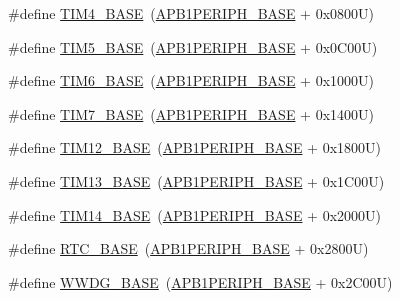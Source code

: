 \begin{DoxyCompactItemize}
\#define \hyperlink{group___peripheral__memory__map_ga56e2d44b0002f316527b8913866a370d}{T\+I\+M4\+\_\+\+B\+A\+SE}~(\hyperlink{group___peripheral__memory__map_ga45666d911f39addd4c8c0a0ac3388cfb}{A\+P\+B1\+P\+E\+R\+I\+P\+H\+\_\+\+B\+A\+SE} + 0x0800\+U)
\item 
\#define \hyperlink{group___peripheral__memory__map_ga3e1671477190d065ba7c944558336d7e}{T\+I\+M5\+\_\+\+B\+A\+SE}~(\hyperlink{group___peripheral__memory__map_ga45666d911f39addd4c8c0a0ac3388cfb}{A\+P\+B1\+P\+E\+R\+I\+P\+H\+\_\+\+B\+A\+SE} + 0x0\+C00\+U)
\item 
\#define \hyperlink{group___peripheral__memory__map_ga8268ec947929f192559f28c6bf7d1eac}{T\+I\+M6\+\_\+\+B\+A\+SE}~(\hyperlink{group___peripheral__memory__map_ga45666d911f39addd4c8c0a0ac3388cfb}{A\+P\+B1\+P\+E\+R\+I\+P\+H\+\_\+\+B\+A\+SE} + 0x1000\+U)
\item 
\#define \hyperlink{group___peripheral__memory__map_ga0ebf54364c6a2be6eb19ded6b18b6387}{T\+I\+M7\+\_\+\+B\+A\+SE}~(\hyperlink{group___peripheral__memory__map_ga45666d911f39addd4c8c0a0ac3388cfb}{A\+P\+B1\+P\+E\+R\+I\+P\+H\+\_\+\+B\+A\+SE} + 0x1400\+U)
\item 
\#define \hyperlink{group___peripheral__memory__map_ga33dea32fadbaecea161c2ef7927992fd}{T\+I\+M12\+\_\+\+B\+A\+SE}~(\hyperlink{group___peripheral__memory__map_ga45666d911f39addd4c8c0a0ac3388cfb}{A\+P\+B1\+P\+E\+R\+I\+P\+H\+\_\+\+B\+A\+SE} + 0x1800\+U)
\item 
\#define \hyperlink{group___peripheral__memory__map_gad20f79948e9359125a40bbf6ed063590}{T\+I\+M13\+\_\+\+B\+A\+SE}~(\hyperlink{group___peripheral__memory__map_ga45666d911f39addd4c8c0a0ac3388cfb}{A\+P\+B1\+P\+E\+R\+I\+P\+H\+\_\+\+B\+A\+SE} + 0x1\+C00\+U)
\item 
\#define \hyperlink{group___peripheral__memory__map_ga862855347d6e1d92730dfe17ee8e90b8}{T\+I\+M14\+\_\+\+B\+A\+SE}~(\hyperlink{group___peripheral__memory__map_ga45666d911f39addd4c8c0a0ac3388cfb}{A\+P\+B1\+P\+E\+R\+I\+P\+H\+\_\+\+B\+A\+SE} + 0x2000\+U)
\item 
\#define \hyperlink{group___peripheral__memory__map_ga4265e665d56225412e57a61d87417022}{R\+T\+C\+\_\+\+B\+A\+SE}~(\hyperlink{group___peripheral__memory__map_ga45666d911f39addd4c8c0a0ac3388cfb}{A\+P\+B1\+P\+E\+R\+I\+P\+H\+\_\+\+B\+A\+SE} + 0x2800\+U)
\item 
\#define \hyperlink{group___peripheral__memory__map_ga9a5bf4728ab93dea5b569f5b972cbe62}{W\+W\+D\+G\+\_\+\+B\+A\+SE}~(\hyperlink{group___peripheral__memory__map_ga45666d911f39addd4c8c0a0ac3388cfb}{A\+P\+B1\+P\+E\+R\+I\+P\+H\+\_\+\+B\+A\+SE} + 0x2\+C00\+U)

\end{DoxyCompactItemize}
